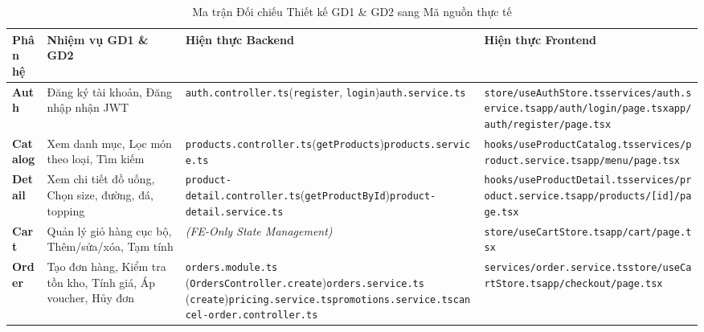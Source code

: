 \documentclass[12pt,a4paper,oneside]{report}
\begin{document}
\begin{table}[H]
\centering
\small
\caption{Ma trận Đối chiếu Thiết kế GD1 \& GD2 sang Mã nguồn thực tế}
\label{tab:implementation-matrix}
\begin{tabularx}{\textwidth}{lp{3.2cm}Xp{4.3cm}}
\toprule
\textbf{Phân hệ} & \textbf{Nhiệm vụ GD1 \& GD2} & \textbf{Hiện thực Backend} & \textbf{Hiện thực Frontend} \\
\midrule
\textbf{Auth} & Đăng ký tài khoản, Đăng nhập nhận JWT & \texttt{auth.controller.ts}\newline (\texttt{register}, \texttt{login})\newline \texttt{auth.service.ts} & \texttt{store/useAuthStore.ts}\newline \texttt{services/auth.service.ts}\newline \texttt{app/auth/login/page.tsx}\newline \texttt{app/auth/register/page.tsx} \\
\midrule
\textbf{Catalog} & Xem danh mục, Lọc món theo loại, Tìm kiếm & \texttt{products.controller.ts}\newline (\texttt{getProducts})\newline \texttt{products.service.ts} & \texttt{hooks/useProductCatalog.ts}\newline \texttt{services/product.service.ts}\newline \texttt{app/menu/page.tsx} \\
\midrule
\textbf{Detail} & Xem chi tiết đồ uống, Chọn size, đường, đá, topping & \texttt{product-detail.controller.ts}\newline (\texttt{getProductById})\newline \texttt{product-detail.service.ts} & \texttt{hooks/useProductDetail.ts}\newline \texttt{services/product.service.ts}\newline \texttt{app/products/[id]/page.tsx} \\
\midrule
\textbf{Cart} & Quản lý giỏ hàng cục bộ, Thêm/sửa/xóa, Tạm tính & \textit{(FE-Only State Management)} & \texttt{store/useCartStore.ts}\newline \texttt{app/cart/page.tsx} \\
\midrule
\textbf{Order} & Tạo đơn hàng, Kiểm tra tồn kho, Tính giá, Áp voucher, Hủy đơn & \texttt{orders.module.ts} (\texttt{OrdersController.create})\newline \texttt{orders.service.ts} (\texttt{create})\newline \texttt{pricing.service.ts}\newline \texttt{promotions.service.ts}\newline \texttt{cancel-order.controller.ts} & \texttt{services/order.service.ts}\newline \texttt{store/useCartStore.ts}\newline \texttt{app/checkout/page.tsx} \\

\end{tabularx}
\end{table}
\end{document}

